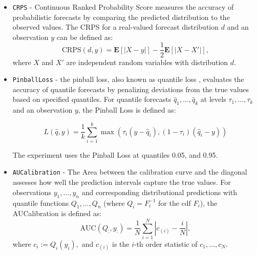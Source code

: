 \begin{itemize}

    \item \texttt{CRPS} - Continuous Ranked Probability Score \citep{matheson1976} measures the accuracy of probabilistic forecasts by comparing the predicted distribution to the observed values. The CRPS for a real-valued forecast distribution $d$ and an observation $y$ can be defined as:
    \[
    \text{CRPS}(d, y) = \mathbf{E} \left[ \left| X - y \right| \right] - \frac{1}{2} \mathbf{E} \left[ \left| X - X' \right| \right],
    \]
    where $X$ and $X'$ are independent random variables with distribution $d$.

    \item \texttt{PinballLoss} - the pinball loss, also known as quantile loss \citep{pinball_loss}, evaluates the accuracy of quantile forecasts by penalizing deviations from the true values based on specified quantiles.
    For quantile forecasts $\hat{q}_1, \dots, \hat{q}_k$ at levels $\tau_1, \dots, \tau_k$ and an observation $y$, the Pinball Loss is defined as:

    \begin{equation}
    L(\hat{q}, y) = \frac{1}{k} \sum_{i=1}^k \max \left(\tau_i (y - \hat{q}_i), (1 - \tau_i) (\hat{q}_i - y)\right)
    \end{equation}

    The experiment uses the Pinball Loss at quantiles 0.05, and 0.95.

    \item \texttt{AUCalibration} - The Area between the calibration curve and the diagonal assesses how well the prediction intervals capture the true values. For observations $y_1, \dots, y_n$ and corresponding distributional predictions with quantile functions $Q_1, \dots, Q_n$ (where $Q_i = F^{-1}_i$ for the cdf $F_i$), the AUCalibration is defined as:
    \begin{equation}
    \mbox{AUC} (Q_:, y_:) = \frac{1}{N} \sum_{i=1}^N \left| c_{(i)} - \frac{i}{N}\right|,
    \end{equation}
    where $c_i := Q_i(y_i),$ and $c_{(i)}$ is the $i$-th order statistic of $c_1, \dots, c_N$.


\end{itemize}
